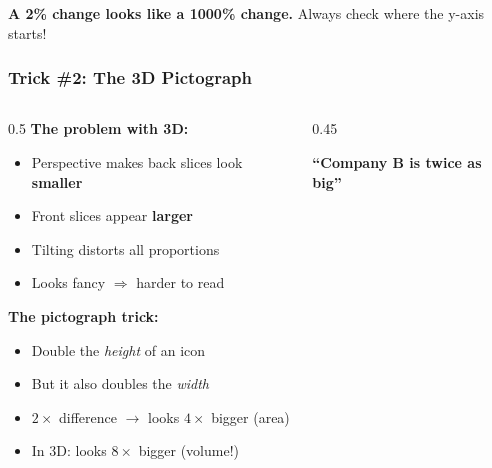 \documentclass[aspectratio=169]{beamer}
\begin{document}
\begin{frame}
\vspace{0.2cm}
\begin{center}
\textcolor{warnred}{\textbf{A 2\% change looks like a 1000\% change.}} Always check where the y-axis starts!
\end{center}
\end{frame}

\begin{frame}
\frametitle{Trick \#2: The 3D Pictograph}

\begin{columns}[T]
\begin{column}{0.5\textwidth}
\vspace{0.3cm}
\textbf{The problem with 3D:}
\begin{itemize}
  \item Perspective makes back slices look \textbf{smaller}
  \item Front slices appear \textbf{larger}
  \item Tilting distorts all proportions
  \item Looks fancy $\Rightarrow$ harder to read
\end{itemize}

\vspace{0.3cm}
\textbf{The pictograph trick:}
\begin{itemize}
  \item Double the \textit{height} of an icon
  \item But it also doubles the \textit{width}
  \item $2\times$ difference $\to$ looks $4\times$ bigger (area)
  \item In 3D: looks $8\times$ bigger (volume!)
\end{itemize}
\end{column}
\begin{column}{0.45\textwidth}
\begin{center}
\vspace{0.2cm}
{\small \textbf{``Company B is twice as big''}}
\vspace{0.2cm}

\end{center}
\end{column}
\end{columns}
\end{frame}
\end{document}
